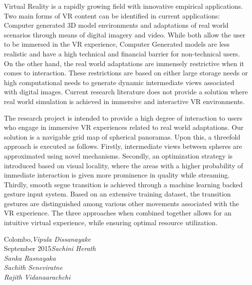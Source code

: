 %
%

\preface

Virtual Reality is a rapidly growing field with innovative empirical applications. Two main forms of VR content can be identified in current applications: Computer generated 3D model environments and adaptations of real world scenarios through means of digital imagery and video. While both allow the user to be immersed in the VR experience, Computer Generated models are less realistic and have a high technical and financial barrier for non-technical users. On the other hand, the real world adaptations are immensely restrictive when it comes to interaction. These restrictions are based on either large storage needs or high computational needs to generate dynamic intermediate views associated with digital images. Current research literature does not provide a solution where real world simulation is achieved in immersive and interactive VR environments.

The research project is intended to provide a high degree of interaction to users who engage in immersive VR experiences related to real world adaptations. Our solution is a navigable grid map of spherical panoramas. Upon this, a threefold approach is executed as follows. Firstly, intermediate views between spheres are approximated using novel mechanisms. Secondly, an optimization strategy is introduced based on visual locality, where the areas with a higher probability of immediate interaction is given more prominence in quality while streaming. Thirdly, smooth segue transition is achieved through a machine learning backed gesture input system. Based on an extensive training dataset, the transition gestures are distinguished among various other movements associated with the VR experience. The three approaches when combined together allows for an intuitive virtual experience, while ensuring optimal resource utilization. 

\vspace{\baselineskip}
\begin{flushright}\noindent
Colombo,\hfill {\it Vipula  Dissanayake}\\
September 2015\hfill {\it Sachini  Herath}\\
\hfill {\it Sanka Rasnayaka}\\
\hfill {\it Sachith Seneviratne}\\
\hfill {\it Rajith Vidanaarachchi}\\
\end{flushright}


